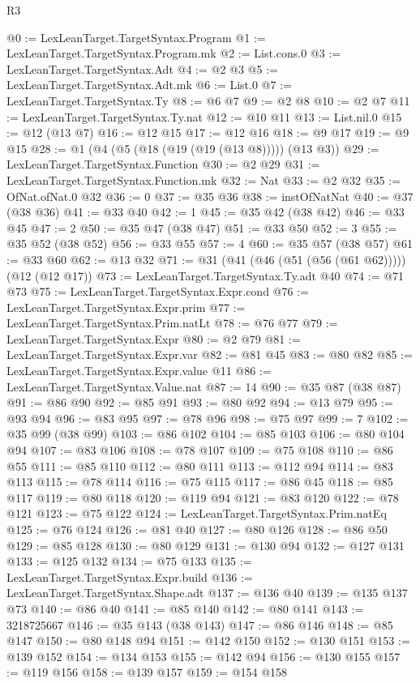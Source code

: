\begin{lexlean}{R3}
\begin{coremodule}
@0 := LexLeanTarget.TargetSyntax.Program
@1 := LexLeanTarget.TargetSyntax.Program.mk
@2 := List.cons.{0}
@3 := LexLeanTarget.TargetSyntax.Adt
@4 := @2 @3
@5 := LexLeanTarget.TargetSyntax.Adt.mk
@6 := List.{0}
@7 := LexLeanTarget.TargetSyntax.Ty
@8 := @6 @7
@9 := @2 @8
@10 := @2 @7
@11 := LexLeanTarget.TargetSyntax.Ty.nat
@12 := @10 @11
@13 := List.nil.{0}
@15 := @12 (@13 @7)
@16 := @12 @15
@17 := @12 @16
@18 := @9 @17
@19 := @9 @15
@28 := @1 (@4 (@5 (@18 (@19 (@19 (@13 @8))))) (@13 @3))
@29 := LexLeanTarget.TargetSyntax.Function
@30 := @2 @29
@31 := LexLeanTarget.TargetSyntax.Function.mk
@32 := Nat
@33 := @2 @32
@35 := OfNat.ofNat.{0} @32
@36 := 0
@37 := @35 @36
@38 := instOfNatNat
@40 := @37 (@38 @36)
@41 := @33 @40
@42 := 1
@45 := @35 @42 (@38 @42)
@46 := @33 @45
@47 := 2
@50 := @35 @47 (@38 @47)
@51 := @33 @50
@52 := 3
@55 := @35 @52 (@38 @52)
@56 := @33 @55
@57 := 4
@60 := @35 @57 (@38 @57)
@61 := @33 @60
@62 := @13 @32
@71 := @31 (@41 (@46 (@51 (@56 (@61 @62))))) (@12 (@12 @17))
@73 := LexLeanTarget.TargetSyntax.Ty.adt @40
@74 := @71 @73
@75 := LexLeanTarget.TargetSyntax.Expr.cond
@76 := LexLeanTarget.TargetSyntax.Expr.prim
@77 := LexLeanTarget.TargetSyntax.Prim.natLt
@78 := @76 @77
@79 := LexLeanTarget.TargetSyntax.Expr
@80 := @2 @79
@81 := LexLeanTarget.TargetSyntax.Expr.var
@82 := @81 @45
@83 := @80 @82
@85 := LexLeanTarget.TargetSyntax.Expr.value @11
@86 := LexLeanTarget.TargetSyntax.Value.nat
@87 := 14
@90 := @35 @87 (@38 @87)
@91 := @86 @90
@92 := @85 @91
@93 := @80 @92
@94 := @13 @79
@95 := @93 @94
@96 := @83 @95
@97 := @78 @96
@98 := @75 @97
@99 := 7
@102 := @35 @99 (@38 @99)
@103 := @86 @102
@104 := @85 @103
@106 := @80 @104 @94
@107 := @83 @106
@108 := @78 @107
@109 := @75 @108
@110 := @86 @55
@111 := @85 @110
@112 := @80 @111
@113 := @112 @94
@114 := @83 @113
@115 := @78 @114
@116 := @75 @115
@117 := @86 @45
@118 := @85 @117
@119 := @80 @118
@120 := @119 @94
@121 := @83 @120
@122 := @78 @121
@123 := @75 @122
@124 := LexLeanTarget.TargetSyntax.Prim.natEq
@125 := @76 @124
@126 := @81 @40
@127 := @80 @126
@128 := @86 @50
@129 := @85 @128
@130 := @80 @129
@131 := @130 @94
@132 := @127 @131
@133 := @125 @132
@134 := @75 @133
@135 := LexLeanTarget.TargetSyntax.Expr.build
@136 := LexLeanTarget.TargetSyntax.Shape.adt
@137 := @136 @40
@139 := @135 @137 @73
@140 := @86 @40
@141 := @85 @140
@142 := @80 @141
@143 := 3218725667
@146 := @35 @143 (@38 @143)
@147 := @86 @146
@148 := @85 @147
@150 := @80 @148 @94
@151 := @142 @150
@152 := @130 @151
@153 := @139 @152
@154 := @134 @153
@155 := @142 @94
@156 := @130 @155
@157 := @119 @156
@158 := @139 @157
@159 := @154 @158

\end{coremodule}
\end{lexlean}
